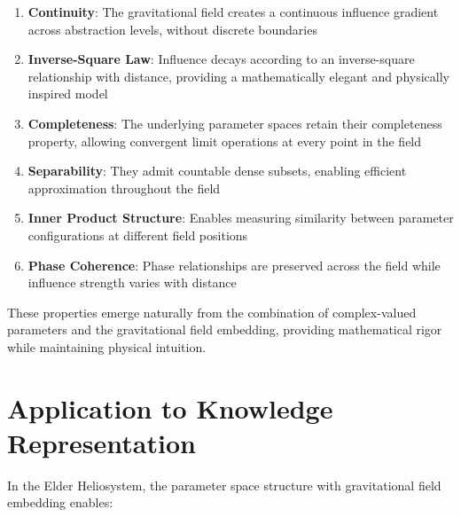 \begin{enumerate}
    \item \textbf{Continuity}: The gravitational field creates a continuous influence gradient across abstraction levels, without discrete boundaries
    
    \item \textbf{Inverse-Square Law}: Influence decays according to an inverse-square relationship with distance, providing a mathematically elegant and physically inspired model
    
    \item \textbf{Completeness}: The underlying parameter spaces retain their completeness property, allowing convergent limit operations at every point in the field
    
    \item \textbf{Separability}: They admit countable dense subsets, enabling efficient approximation throughout the field
    
    \item \textbf{Inner Product Structure}: Enables measuring similarity between parameter configurations at different field positions
    
    \item \textbf{Phase Coherence}: Phase relationships are preserved across the field while influence strength varies with distance
\end{enumerate}

These properties emerge naturally from the combination of complex-valued parameters and the gravitational field embedding, providing mathematical rigor while maintaining physical intuition.

\section{Application to Knowledge Representation}

In the Elder Heliosystem, the parameter space structure with gravitational field embedding enables:

